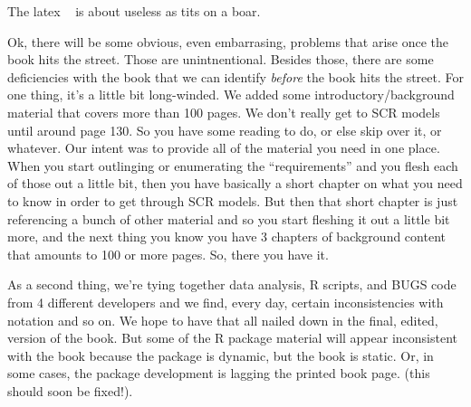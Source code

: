 The latex \mbox{\tt ~} is about useless as tits on a boar.

Ok, there will be some obvious, even embarrasing, problems that arise
once the book hits the street. Those are unintnentional. Besides
those, there are some deficiencies with the book that we can identify
{\it before} the book hits the street. For one thing, it's a little
bit long-winded. We added some introductory/background material that
covers more than 100 pages. We don't really get to SCR models until
around page 130.  So you have some reading to do, or else skip over
it, or whatever. Our intent was to provide all of the material you
need in one place. When you start outlinging or enumerating the
``requirements'' and you flesh each of those out a little bit, then
you have basically a short chapter on what you need to know in order
to get through SCR models. But then that short chapter is just
referencing a bunch of other material and so you start fleshing it out
a little bit more, and the next thing you know you have 3 chapters of
background content that amounts to 100 or more pages.  So, there you
have it.  

As a second thing, we're tying together data analysis, R scripts, and
BUGS code from 4 different developers and we find, every day, certain
inconsistencies with notation and so on. We hope to have that all
nailed down in the final, edited, version of the book. But some of the
R package material will appear inconsistent with the book because the
package is dynamic, but the book is static. Or, in some cases, the
package development is lagging the printed book page. (this should
soon be fixed!). 






